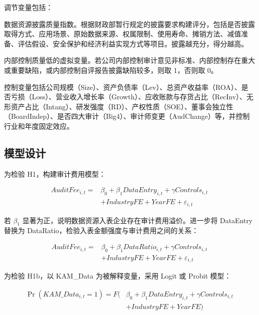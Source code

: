 \documentclass[UTF8,zihao=-4,a4paper]{ctexart}
\begin{document}
调节变量包括：

\begin{description}[leftmargin=7em,style=nextline]
  \item[DiscQuality] 数据资源披露质量指数。根据财政部暂行规定的披露要求构建评分，包括是否披露取得方式、应用场景、原始数据来源、权属限制、使用寿命、摊销方法、减值准备、评估假设、安全保护和经济利益实现方式等项目。披露越充分，得分越高。
  \item[ICWeak] 内部控制质量低的虚拟变量。若公司内部控制审计意见非标准、内部控制存在重大或重要缺陷，或内部控制自评报告披露缺陷较多，则取 1，否则取 0。
\end{description}

控制变量包括公司规模（Size）、资产负债率（Lev）、总资产收益率（ROA）、是否亏损（Loss）、营业收入增长率（Growth）、应收账款与存货占比（RecInv）、无形资产占比（Intang）、研发强度（RD）、产权性质（SOE）、董事会独立性（BoardIndep）、是否四大审计（Big4）、审计师变更（AudChange）等，并控制行业和年度固定效应。

\subsection{模型设计}

为检验 H1，构建审计费用模型：

\begin{equation}
\begin{aligned}
AuditFee_{i,t} ={}& \beta_0 + \beta_1 DataEntry_{i,t}
 + \gamma Controls_{i,t} \\
&+ IndustryFE + YearFE + \varepsilon_{i,t}
\end{aligned}
\end{equation}

若 $\beta_1$ 显著为正，说明数据资源入表企业存在审计费用溢价。进一步将 DataEntry 替换为 DataRatio，检验入表金额强度与审计费用之间的关系：

\begin{equation}
\begin{aligned}
AuditFee_{i,t} ={}& \beta_0 + \beta_1 DataRatio_{i,t}
 + \gamma Controls_{i,t} \\
&+ IndustryFE + YearFE + \varepsilon_{i,t}
\end{aligned}
\end{equation}

为检验 H1b，以 KAM\_Data 为被解释变量，采用 Logit 或 Probit 模型：

\begin{equation}
\begin{aligned}
\Pr(KAM\_Data_{i,t}=1) =
F(&\beta_0 + \beta_1 DataEntry_{i,t}
+ \gamma Controls_{i,t} \\
&+ IndustryFE + YearFE)
\end{aligned}
\end{equation}
\end{document}
